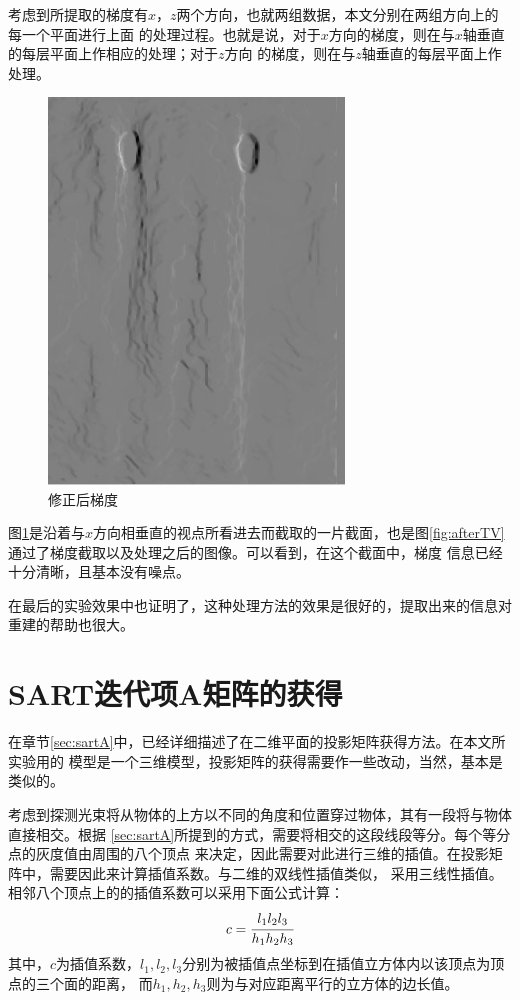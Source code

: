 考虑到所提取的梯度有$x$，$z$两个方向，也就两组数据，本文分别在两组方向上的每一个平面进行上面
的处理过程。也就是说，对于$x$方向的梯度，则在与$x$轴垂直的每层平面上作相应的处理；对于$z$方向
的梯度，则在与$z$轴垂直的每层平面上作处理。
\begin{figure}[!h]
\center
\includegraphics[width=0.7\textwidth]{figure/patternp/gradp.jpg}
\caption{修正后梯度}
\label{fig:gradp}
\end{figure}
图\ref{fig:gradp}是沿着与$x$方向相垂直的视点所看进去而截取的一片截面，也是图\ref{fig:afterTV}
通过了梯度截取以及处理之后的图像。可以看到，在这个截面中，梯度
信息已经十分清晰，且基本没有噪点。

在最后的实验效果中也证明了，这种处理方法的效果是很好的，提取出来的信息对重建的帮助也很大。


\section{SART迭代项A矩阵的获得}
在章节\ref{sec:sartA}中，已经详细描述了在二维平面的投影矩阵获得方法。在本文所实验用的
模型是一个三维模型，投影矩阵的获得需要作一些改动，当然，基本是类似的。

考虑到探测光束将从物体的上方以不同的角度和位置穿过物体，其有一段将与物体直接相交。根据
\ref{sec:sartA}所提到的方式，需要将相交的这段线段等分。每个等分点的灰度值由周围的八个顶点
来决定，因此需要对此进行三维的插值。在投影矩阵中，需要因此来计算插值系数。与二维的双线性插值类似，
采用三线性插值。相邻八个顶点上的的插值系数可以采用下面公式计算：
\begin{equation}
c = \cfrac{l_1l_2l_3}{h_1h_2h_3}
\end{equation}
其中，$c$为插值系数，$l_1,l_2,l_3$分别为被插值点坐标到在插值立方体内以该顶点为顶点的三个面的距离，
而$h_1,h_2,h_3$则为与对应距离平行的立方体的边长值。

